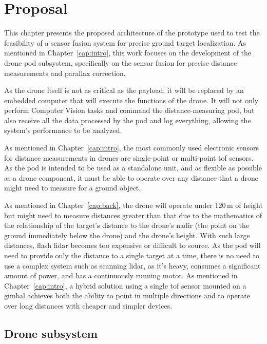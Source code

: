 
\chapter{Proposal}
\label{cap:prop}

This chapter presents the proposed architecture of the prototype used to test the
feasibility of a sensor fusion system for precise ground target localization. As mentioned
in Chapter~\ref{cap:intro}, this work focuses on the development of the drone pod subsystem,
specifically on the sensor fusion for precise distance measurements and parallax correction.

As the drone itself is not as critical as the payload, it will be replaced by an
embedded computer that will execute the functions of the drone. It will not only perform
Computer Vision tasks and command the distance-measuring pod, but also receive all the data
processed by the pod and log everything, allowing the system's performance to be analyzed.

As mentioned in Chapter~\ref{cap:intro}, the most commonly used electronic sensors for
distance measurements in drones are single-point or multi-point \gls{tof} sensors. As the
pod is intended to be used as a standalone unit, and as flexible as possible as a drone
component, it must be able to operate over any distance that a drone might need to measure
for a ground object.

As mentioned in Chapter~\ref{cap:back}, the drone will operate under 120\,m of height but
might need to measure distances greater than that due to the mathematics of the
relationship of the target's distance to the drone's nadir (the point on the ground
immediately below the drone) and the drone's height.
With such large distances, flash \gls{lidar} becomes too expensive or
difficult to source.
As the pod will need to provide only the distance to a single target at a time,
there is no need to use a complex system such as scanning \gls{lidar}, as it's
heavy, consumes a significant amount of power, and has a continuously running motor.
As mentioned in Chapter~\ref{cap:intro}, a hybrid solution using a single \gls{tof}
sensor mounted on a gimbal achieves both the ability to point in multiple directions
and to operate over long distances with cheaper and simpler devices.

\section{Drone subsystem}

